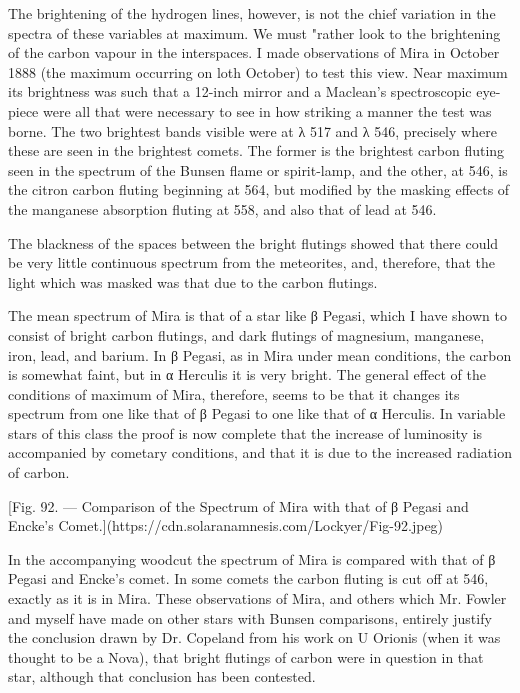 \documentclass[a4paper, 12pt, oneside, polutonikogreek, english]{article}
\begin{document}
The brightening of the hydrogen lines, however, is not the chief variation in the spectra of these variables at maximum. We must "rather look to the brightening of the carbon vapour in the interspaces. I made observations of Mira in October 1888 (the maximum occurring on loth October) to test this view. Near maximum its brightness was such that a 12-inch mirror and a Maclean's spectroscopic eye-piece were all that were necessary to see in how striking a manner the test was borne. The two brightest bands visible were at λ 517 and	λ 546, precisely where these are seen in the brightest comets. The former is the brightest carbon fluting seen in the spectrum of the Bunsen flame or spirit-lamp, and the other, at 546, is the citron carbon fluting beginning at 564, but modified by the masking effects of the manganese absorption fluting at 558, and also that of lead at 546.

The blackness of the spaces between the bright flutings showed that there could be very little continuous spectrum from the meteorites, and, therefore, that the light which was masked was that due to the carbon flutings.

The mean spectrum of Mira is that of a star like β Pegasi, which I have shown to consist of bright carbon flutings, and dark flutings of magnesium, manganese, iron, lead, and barium. In β Pegasi, as in Mira under mean conditions, the carbon is somewhat faint, but in α Herculis it is very bright. The general effect of the conditions of maximum of Mira, therefore, seems to be that it changes its spectrum from one like that of β Pegasi to one like that of α Herculis. In variable stars of this class the proof is now complete that the increase of luminosity is accompanied by cometary conditions, and that it is due to the increased radiation of carbon.

[Fig. 92. --- Comparison of the Spectrum of Mira with that of β Pegasi and Encke's Comet.](https://cdn.solaranamnesis.com/Lockyer/Fig-92.jpeg)

In the accompanying woodcut the spectrum of Mira is compared with that of β Pegasi and Encke's comet. In some comets the carbon fluting is cut off at 546, exactly as it is in Mira. These observations of Mira, and others which Mr. Fowler and myself have made on other stars with Bunsen comparisons, entirely justify the conclusion drawn by Dr. Copeland from his work on U Orionis (when it was thought to be a Nova), that bright flutings of carbon were in question in that star, although that conclusion has been contested.
\end{document}
